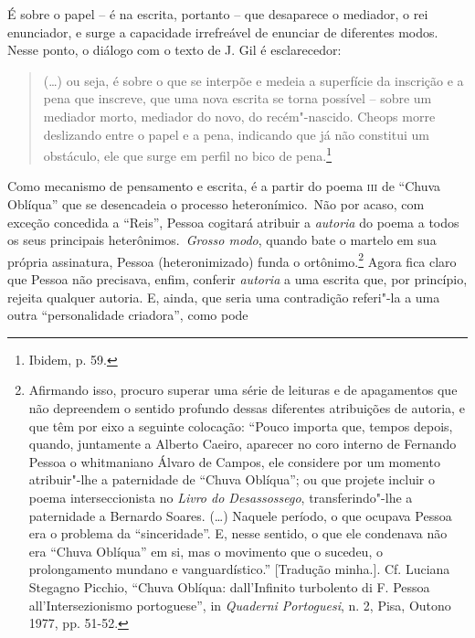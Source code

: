 É sobre o papel -- é na escrita, portanto -- que desaparece o mediador,
o rei enunciador, e surge a capacidade irrefreável de enunciar de
diferentes modos. Nesse ponto, o diálogo com o texto de J. Gil é
esclarecedor:

\begin{quote}
(\ldots{}) ou seja, é sobre o que se interpõe e medeia a superfície da
inscrição e a pena que inscreve, que uma nova escrita se torna possível
-- sobre um mediador morto, mediador do novo, do recém"-nascido. Cheops
morre deslizando entre o papel e a pena, indicando que já não constitui
um obstáculo, ele que surge em perfil no bico de pena.\footnote{Ibidem,
  p. 59.}
\end{quote}

Como mecanismo de pensamento e escrita, é a partir do poema \textsc{iii}
de ``Chuva Oblíqua'' que se desencadeia o processo heteronímico.~Não por
acaso, com exceção concedida a ``Reis'', Pessoa cogitará atribuir a
\emph{autoria} do poema a todos os seus principais heterônimos.~\emph{Grosso modo}, quando bate o martelo em sua própria assinatura, Pessoa (heteronimizado) funda o ortônimo.\footnote{Afirmando isso,
  procuro superar uma série de leituras e de apagamentos que não
  depreendem o sentido profundo dessas diferentes atribuições de
  autoria, e que têm por eixo a seguinte colocação: ``Pouco importa que,
  tempos depois, quando, juntamente a Alberto Caeiro, aparecer no coro
  interno de Fernando Pessoa o whitmaniano Álvaro de Campos, ele
  considere por um momento atribuir"-lhe a paternidade de ``Chuva
  Oblíqua''; ou que projete incluir o poema interseccionista no
  \emph{Livro do Desassossego}, transferindo"-lhe a paternidade a
  Bernardo Soares. (\ldots{}) Naquele período, o que ocupava Pessoa era o
  problema da ``sinceridade''. E, nesse sentido, o que ele condenava não
  era ``Chuva Oblíqua'' em si, mas o movimento que o sucedeu, o
  prolongamento mundano e vanguardístico.'' {[}Tradução minha.{]}. Cf.
  Luciana Stegagno Picchio, ``Chuva Oblíqua: dall'Infinito turbolento di
  F. Pessoa all'Intersezionismo portoguese'', in \emph{Quaderni
  Portoguesi}, n. 2, Pisa, Outono 1977, pp. 51-52.} Agora fica claro que
Pessoa não precisava, enfim, conferir \emph{autoria} a uma escrita que,
por princípio, rejeita qualquer autoria. E, ainda, que seria uma
contradição referi"-la a uma outra ``personalidade criadora'', como pode
